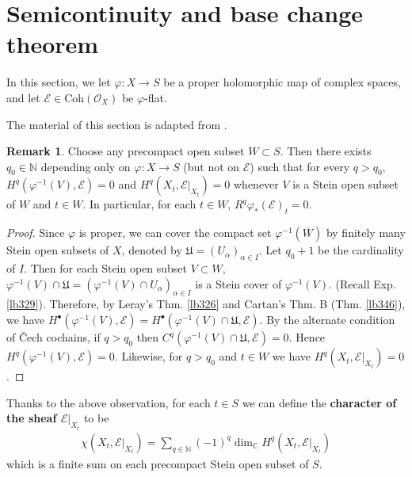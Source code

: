 \documentclass[12pt,b5paper,notitlepage]{report}
\theoremstyle{definition}
\newtheorem{rem}[df]{Remark}
\theoremstyle{plain}
\newcommand{\fk}{\mathfrak}
\newcommand{\ovl}{\overline}
\newcommand{\scr}{\mathscr}
\newcommand{\blt}{\bullet}
\newcommand{\Cbb}{\mathbb C}
\newcommand{\Nbb}{\mathbb N}
\newcommand{\Coh}{\mathrm{Coh}}
\numberwithin{equation}{section}
\begin{document}
\section{Semicontinuity and base change theorem} \label{lb358}


In this section, we let $\varphi:X\rightarrow S$ be a proper holomorphic map of complex spaces, and let $\scr E\in\Coh(\scr O_X)$ be  $\varphi$-flat.

The material of this section is adapted from \cite[Sec. 10.5]{GR-b}.





\begin{rem}\label{lb348}
Choose any precompact open subset $W\subset S$. Then there exists $q_0\in\Nbb$ depending only on $\varphi:X\rightarrow S$ (but not on $\scr E$) such that for every $q> q_0$, $H^q(\varphi^{-1}(V),\scr E)=0$ and $H^q(X_t,\scr E|_{X_t})=0$ whenever $V$ is a Stein open subset of $W$ and $t\in W$. In particular, for each $t\in W$, $R^q\varphi_*(\scr E)_t=0$.
\end{rem}


\begin{proof}
Since $\varphi$ is proper, we can cover the compact set $\varphi^{-1}(\ovl W)$ by finitely many Stein open subsets of $X$, denoted by $\fk U=(U_\alpha)_{\alpha\in I}$. Let $q_0+1$ be the cardinality of $I$. Then for each Stein open subset $V\subset W$, $\varphi^{-1}(V)\cap\fk U=(\varphi^{-1}(V)\cap U_\alpha)_{\alpha\in I}$ is a Stein cover of $\varphi^{-1}(V)$. (Recall Exp. \ref{lb329}). Therefore, by Leray's Thm. \ref{lb326} and Cartan's Thm. B  (Thm. \ref{lb346}), we have $H^\blt(\varphi^{-1}(V),\scr E)=H^\blt(\varphi^{-1}(V)\cap\fk U,\scr E)$. By the alternate condition of \v Cech cochains, if $q> q_0$ then $C^q(\varphi^{-1}(V)\cap\fk U,\scr E)=0$. Hence $H^q(\varphi^{-1}(V),\scr E)=0$. Likewise, for $q> q_0$ and $t\in W$ we have $H^q(X_t,\scr E|_{X_t})=0$.
\end{proof}



Thanks to the above observation, for each $t\in S$ we can define the \textbf{character of the sheaf $\scr E\vert_{X_t}$} \index{zz@$\chi(X,\scr E)=\sum_q (-1)^q\dim_\Cbb H^q(X,\scr E)$} to be
\begin{align*}
\chi(X_t,\scr E|_{X_t})=\sum_{q\in\Nbb}(-1)^q\dim_\Cbb H^q(X_t,\scr E|_{X_t})
\end{align*}
which is a finite sum on each precompact Stein open subset of $S$.
\end{document}
